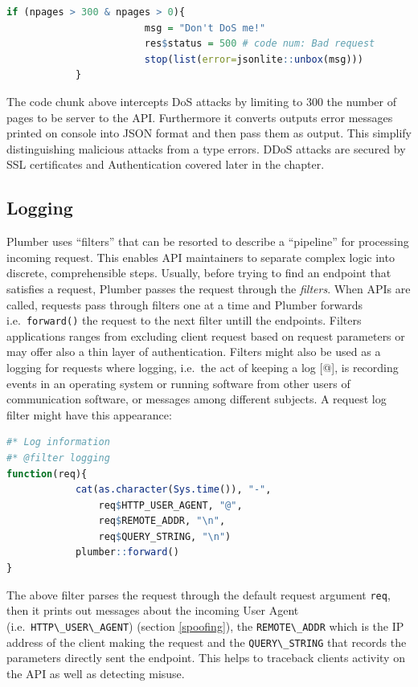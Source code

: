 \documentclass[
  12pt,
  a4paper,
  oneside]{book}
\newcommand{\passthrough}[1]{#1}
\theoremstyle{definition}
\theoremstyle{definition}
\theoremstyle{definition}
\theoremstyle{remark}
\begin{document}
\begin{lstlisting}[language=R]
 if (npages > 300 & npages > 0){
                        msg = "Don't DoS me!"
                        res$status = 500 # code num: Bad request
                        stop(list(error=jsonlite::unbox(msg)))     
            }
\end{lstlisting}

The code chunk above intercepts DoS attacks by limiting to 300 the number of pages to be server to the API. Furthermore it converts outputs error messages printed on console into JSON format and then pass them as output. This simplify distinguishing malicious attacks from a type errors. DDoS attacks are secured by SSL certificates and Authentication covered later in the chapter.

\hypertarget{logging}{%
\subsection{Logging}\label{logging}}

Plumber uses ``filters'' that can be resorted to describe a ``pipeline'' for processing incoming request. This enables API maintainers to separate complex logic into discrete, comprehensible steps. Usually, before trying to find an endpoint that satisfies a request, Plumber passes the request through the \emph{filters}. When APIs are called, requests pass through filters one at a time and Plumber forwards i.e.~\passthrough{\lstinline!forward()!} the request to the next filter untill the endpoints. Filters applications ranges from excluding client request based on request parameters or may offer also a thin layer of authentication. Filters might also be used as a logging for requests where logging, i.e.~the act of keeping a log {[}@{]}, is recording events in an operating system or running software from other users of communication software, or messages among different subjects.
A request log filter might have this appearance:

\begin{lstlisting}[language=R]
#* Log information
#* @filter logging
function(req){
            cat(as.character(Sys.time()), "-",
                req$HTTP_USER_AGENT, "@", 
                req$REMOTE_ADDR, "\n",
                req$QUERY_STRING, "\n")
            plumber::forward()
}
\end{lstlisting}

The above filter parses the request through the default request argument \passthrough{\lstinline!req!}, then it prints out messages about the incoming User Agent (i.e.~\passthrough{\lstinline!HTTP\_USER\_AGENT!}) (section \ref{spoofing}), the \passthrough{\lstinline!REMOTE\_ADDR!} which is the IP address of the client making the request \citeyearpar{plumber} and the \passthrough{\lstinline!QUERY\_STRING!} that records the parameters directly sent the endpoint. This helps to traceback clients activity on the API as well as detecting misuse.
\end{document}
